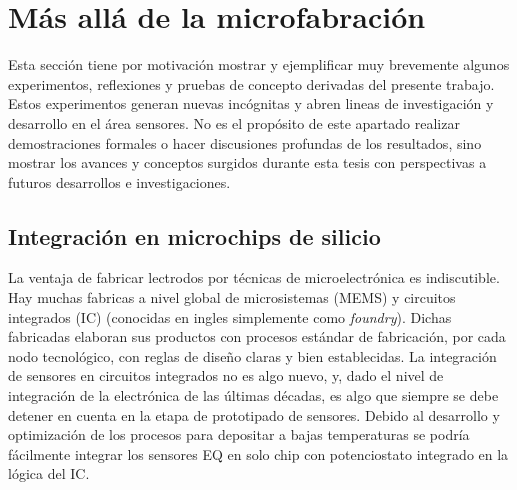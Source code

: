 

\section{Más allá de la microfabración}
	
	  Esta sección tiene por motivación mostrar y ejemplificar muy brevemente algunos experimentos, reflexiones y pruebas de concepto derivadas del presente trabajo. Estos experimentos generan nuevas incógnitas y abren lineas de investigación y desarrollo en el área sensores. No es el propósito de este apartado realizar demostraciones formales o hacer discusiones profundas de los resultados, sino mostrar los avances y conceptos surgidos durante esta tesis con perspectivas a futuros desarrollos e investigaciones.

	\subsection{Integración en microchips de silicio}

	  La ventaja de fabricar lectrodos por técnicas de microelectrónica es indiscutible. Hay muchas fabricas a nivel global  de microsistemas (MEMS) y circuitos integrados (IC) (conocidas en ingles simplemente como \textit{foundry}). Dichas fabricadas elaboran sus productos con procesos estándar de fabricación, por cada nodo tecnológico, con reglas de diseño claras y bien establecidas. La integración de sensores en circuitos integrados no es algo nuevo, y, dado el nivel de integración de la electrónica de las últimas décadas, es algo que siempre se debe detener en cuenta en la etapa de prototipado de sensores.\cite{Wang2012,Liu1993,Novell2012,Yu2013,Sarkar2014} Debido al desarrollo y optimización de los procesos para depositar \pdm\space a bajas temperaturas se podría fácilmente integrar los sensores EQ en solo chip con potenciostato integrado en la lógica del IC.
 	
